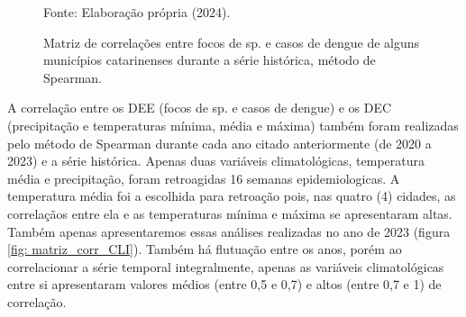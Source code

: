 \documentclass[
	12pt,				%
	openright,			%
	oneside,			%
	a4paper,			%
	english,			%
	french,				%
	spanish,			%
	brazil				%
	dvipsnames, table]{abntex2}
\begin{document}
\begin{figure}[htbp]
    \centering
    \caption{Matriz de correlações entre focos de  sp. e casos de dengue de alguns municípios catarinenses durante a série histórica, método de Spearman.}
    \label{fig: matriz_corr_DEEtotal}
    \hfill
    \hfill
    \small{Fonte: Elaboração própria (2024).}
\end{figure}

\indent A correlação entre os \acrshort{DEE} (focos de  sp. e casos de dengue) e os \acrshort{DEC} (precipitação e temperaturas mínima, média e máxima) também foram realizadas pelo método de Spearman durante cada ano citado anteriormente (de 2020 a 2023) e a série histórica. Apenas duas variáveis climatológicas, temperatura média e precipitação, foram retroagidas 16 semanas epidemiologicas. A temperatura média foi a escolhida para retroação pois, nas quatro (4) cidades, as correlaçãos entre ela e as temperaturas mínima e máxima se apresentaram altas. Também apenas apresentaremos essas análises realizadas no ano de 2023 (figura \ref{fig: matriz_corr_CLI}). Também há flutuação entre os anos, porém ao correlacionar a série temporal integralmente, apenas as variáveis climatológicas entre si apresentaram valores médios (entre 0,5 e 0,7) e altos (entre 0,7 e 1) de correlação.
\end{document}
